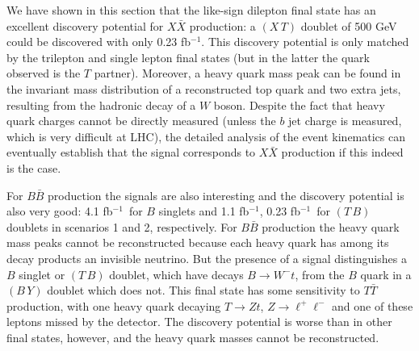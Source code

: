 \documentclass[12pt,a4paper]{article}
\newcommand{\fbin}{fb$^{-1}$}
\newcommand{\TT}{T \bar T}
\newcommand{\BB}{B \bar B}
\newcommand{\XX}{X \bar X}
\newcommand{\TB}{(T \, B)}
\newcommand{\BY}{(B \, Y)}
\begin{document}
We have shown in this section that the like-sign dilepton final state has an excellent discovery potential for $\XX$ production: a $(X \, T)$ doublet of 500 GeV could be discovered with only 0.23 \fbin. This discovery potential is only matched by the trilepton and single lepton final states (but in the latter the quark observed is the $T$ partner).
Moreover, a heavy quark mass peak can be found in the invariant mass distribution of a reconstructed top quark and two extra jets, resulting from the hadronic decay of a $W$ boson. Despite the fact that heavy quark charges cannot be directly measured (unless the $b$ jet charge is measured, which is very difficult at LHC), the detailed analysis of the event kinematics can eventually establish that the signal corresponds to $\XX$ production if this indeed is the case.

For $\BB$ production the signals are also interesting and the discovery potential is also very good:  4.1 \fbin\ for $B$ singlets and 1.1 \fbin, 0.23 \fbin\ for $(T \, B)$ doublets in scenarios 1 and 2, respectively. For $\BB$ production the heavy quark mass peaks cannot be reconstructed because each heavy quark has among its decay products an invisible neutrino. But the presence of a signal distinguishes a $B$ singlet or $\TB$ doublet, which have decays $B \to W^- t$, from the $B$ quark in a $\BY$ doublet which does not.
This final state has some sensitivity to $\TT$ production, with one heavy quark decaying $T \to Zt$, $Z \to \ell^+ \ell^-$ and one of these leptons missed by the detector. The discovery potential is worse than in other final states, however, and the heavy quark masses cannot be reconstructed.
\end{document}
